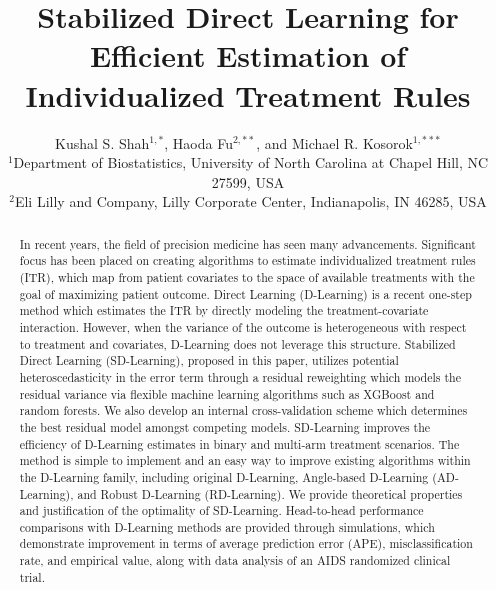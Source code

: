 \documentclass[useAMS,usenatbib]{biom}
\title[SD-Learning for Efficient Estimation of Individualized Treatment Rules]{Stabilized Direct Learning for Efficient Estimation of Individualized Treatment Rules}
\author{Kushal S. Shah$^{1,*}$\email{kushshah@live.unc.edu}, 
Haoda Fu$^{2,**}$\email{fu\_haoda@lilly.com}, and 
Michael R. Kosorok$^{1,***}$\email{kosorok@unc.edu} \\
$^{1}$Department of Biostatistics, University of North Carolina at Chapel Hill, NC 27599, USA \\
$^{2}$Eli Lilly and Company, Lilly Corporate Center, Indianapolis, IN 46285, USA}
\begin{document}






\label{firstpage}


\begin{abstract}
In recent years, the field of precision medicine has seen many advancements. Significant focus has been placed on creating algorithms to estimate individualized treatment rules (ITR), which map from patient covariates to the space of available treatments with the goal of maximizing patient outcome. Direct Learning (D-Learning) is a recent one-step method which estimates the ITR by directly modeling the treatment-covariate interaction. However, when the variance of the outcome is heterogeneous with respect to treatment and covariates, D-Learning does not leverage this structure. Stabilized Direct Learning (SD-Learning), proposed in this paper, utilizes potential heteroscedasticity in the error term through a residual reweighting which models the residual variance via flexible machine learning algorithms such as XGBoost and random forests. We also develop an internal cross-validation scheme which determines the best residual model amongst competing models. SD-Learning improves the efficiency of D-Learning estimates in binary and multi-arm treatment scenarios. The method is simple to implement and an easy way to improve existing algorithms within the D-Learning family, including original D-Learning, Angle-based D-Learning (AD-Learning), and Robust D-Learning (RD-Learning). We provide theoretical properties and justification of the optimality of SD-Learning. Head-to-head performance comparisons with D-Learning methods are provided through simulations, which demonstrate improvement in terms of average prediction error (APE), misclassification rate, and empirical value, along with data analysis of an AIDS randomized clinical trial.\\
\end{abstract}
\end{document}
